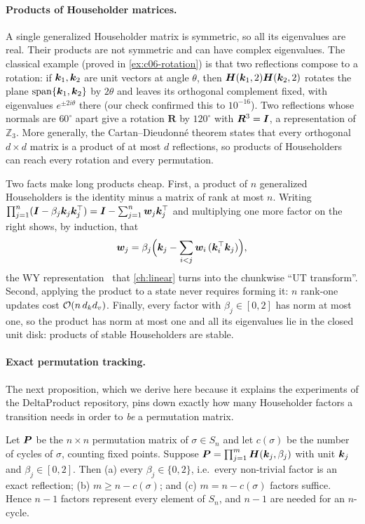 \paragraph{Products of Householder matrices.}
A single generalized Householder matrix is symmetric, so all its eigenvalues are real. Their
products are not symmetric and can have complex eigenvalues. The classical example
(proved in \cref{ex:c06-rotation}) is that two reflections compose to a rotation: if $\bm{k}_1,\bm{k}_2$
are unit vectors at angle $\theta$, then $\bm{H}(\bm{k}_1,2)\bm{H}(\bm{k}_2,2)$ rotates the plane
$\mathrm{span}\{\bm{k}_1,\bm{k}_2\}$ by $2\theta$ and leaves its orthogonal complement fixed, with
eigenvalues $e^{\pm 2i\theta}$ there (our check confirmed this to $10^{-16}$). Two
reflections whose normals are $60^\circ$ apart give a rotation $\bm{R}$ by $120^\circ$ with
$\bm{R}^3=\bm{I}$, a representation of $\mathbb{Z}_3$. More generally, the
Cartan--Dieudonn\'e theorem states that every orthogonal $d\times d$ matrix is a product of
at most $d$ reflections, so products of Householders can reach every rotation and every
permutation.

Two facts make long products cheap. First, a product of $n$ generalized Householders is
the identity minus a matrix of rank at most $n$. Writing
$\prod_{j=1}^{n}(\bm{I}-\beta_j\bm{k}_j\bm{k}_j^{\top})=\bm{I}-\sum_{j=1}^{n}\bm{w}_j\bm{k}_j^{\top}$ and multiplying
one more factor on the right shows, by induction, that
\begin{equation}\label{eq:c06-wy}
  \bm{w}_j=\beta_j\Big(\bm{k}_j-\sum_{i<j}\bm{w}_i\,(\bm{k}_i^{\top}\bm{k}_j)\Big),
\end{equation}
the WY representation~\citep{c03-bischof1987wy} that \cref{ch:linear} turns into the
chunkwise ``UT transform''. Second, applying the product to a state never requires forming
it: $n$ rank-one updates cost $\mathcal{O}(n\,d_kd_v)$. Finally, every factor with
$\beta_j\in[0,2]$ has norm at most one, so the product has norm at most one and all its
eigenvalues lie in the closed unit disk: products of stable Householders are stable.

\paragraph{Exact permutation tracking.}
The next proposition, which we derive here because it explains the experiments of the
DeltaProduct repository, pins down exactly how many Householder factors a transition needs
in order to \emph{be} a permutation matrix.

\begin{proposition}\label{prop:c06-perm}
Let $\bm{P}$ be the $n\times n$ permutation matrix of $\sigma\in S_n$ and let $c(\sigma)$ be the
number of cycles of $\sigma$, counting fixed points. Suppose
$\bm{P}=\prod_{j=1}^{m}\bm{H}(\bm{k}_j,\beta_j)$ with unit $\bm{k}_j$ and $\beta_j\in[0,2]$. Then
(a) every $\beta_j\in\{0,2\}$, i.e.\ every non-trivial factor is an exact reflection;
(b) $m\ge n-c(\sigma)$; and (c) $m=n-c(\sigma)$ factors suffice. Hence $n-1$ factors
represent every element of $S_n$, and $n-1$ are needed for an $n$-cycle.
\end{proposition}

